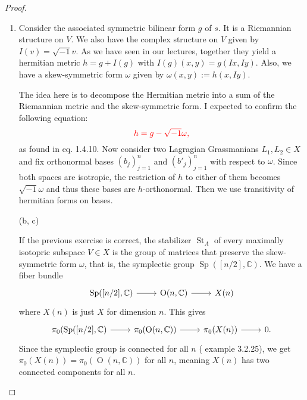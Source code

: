 \documentclass{article}
\newcommand{\C}{\mathbb{C}}
\renewcommand{\O}{\operatorname{O}}
\DeclareMathOperator{\U}{U}
\DeclareMathOperator{\Sp}{Sp}
\DeclareMathOperator{\St}{St}
\begin{document}
\begin{proof}\leavevmode
	\begin{enumerate}[label*=(\alph*)]
		\item Consider the associated symmetric bilinear form $g$ of $s$. It is a Riemannian structure on $V$. We also have the complex structure on $V$ given by $I(v)=\sqrt{-1}v$. As we have seen in our lectures, together they yield a hermitian metric $h=g+I(g)$ with $I(g)(x,y)=g(Ix,Iy)$. Also, we have a skew-symmetric form $\omega$ given by $\omega(x,y):=h(x,Iy)$.
		
		{\color{red}The idea here is to decompose the Hermitian metric into a sum of the Riemannian metric and the skew-symmetric form. I expected to confirm the following equation:}
		\[{\color{red}h=g-\sqrt{-1}\omega,}\]
		{\color{red}as found in \cite{piccione} eq. 1.4.10.}
		Now consider two Lagragian Grassmanians $L_1,L_2\in X$ and fix orthonormal bases $(b_j)_{j=1}^n$ and $(b'_j)_{j=1}^n$ with respect to $\omega$. Since both spaces are isotropic, the restriction of $h$ to either of them becomes $\sqrt{-1}\omega$ and thus these bases are $h$-orthonormal. Then we use transitivity of hermitian forms on bases.
		\item[(b, c)] \iffalse An interesting example (\cite{hatcher}, 4.53) of a fiber bundle is $S^1\to S^{2n+1}\to\C P^n$, given by the map that sends a point to its equivalence class and, as noted in \cref{ex:3.2}, has fiber $S^1$. Surprisingly, this is the case $n=1$ for the more general fiber bundle $\U(n)\to V_n(\C^k)\to G_n(\C^k)$ where $V_n(\C^k)$ is the space of $n$-tuples of orthonormal vectors in $\C^k$ and $G_n(\C^k)$ is the space of $n$-subspaces in $\C^k$. The arrow in the right assigns to a $n$-tuple the vector space it generates, so the fiber is given by all the orthonormal $n$-tuples that generate any given linear space, which is precisely the group of $\U(n)$ by the Gram-Schmidt process.\fi
		
		If the previous exercise is correct, the stabilizer $\St_A$ of every maximally isotopric subspace $V\in X$ is the group of matrices that preserve the skew-symmetric form $\omega$, that is, the symplectic group $\Sp([n/2],\C)$. We have a fiber bundle
		\[\begin{tikzcd}
			\Sp([n/2],\C)\arrow[r]&\O(n,\C)\arrow[r]&X(n)
		\end{tikzcd}\]
		where $X(n)$ is just $X$ for dimension $n$. This gives
			\[\begin{tikzcd}[row sep=tiny]
			\pi_0(\Sp([n/2],\C)\arrow[r]&\pi_0(\O(n,\C))\arrow[r]&\pi_0(X(n))\arrow[r]&0.
		\end{tikzcd}\]
		Since the symplectic group is connected for all $n$ (\cite{piccione} example 3.2.25), we get $\pi_0(X(n))=\pi_0(\O(n,\C))$ for all $n$, meaning $X(n)$ has two connected components for all $n$.


	\end{enumerate}
\end{proof}

\printbibliography
\end{document}
